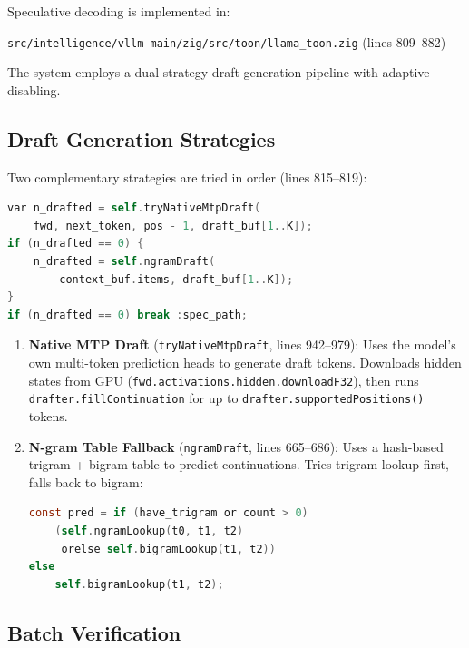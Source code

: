 \documentclass[11pt]{article}
\begin{document}
Speculative decoding is implemented in:
\begin{center}
\texttt{src/intelligence/vllm-main/zig/src/toon/llama\_toon.zig} (lines 809--882)
\end{center}

The system employs a dual-strategy draft generation pipeline with adaptive
disabling.

\subsection{Draft Generation Strategies}

Two complementary strategies are tried in order (lines 815--819):

\begin{lstlisting}[language=C,caption={Dual draft strategy (llama\_toon.zig:815--819)}]
var n_drafted = self.tryNativeMtpDraft(
    fwd, next_token, pos - 1, draft_buf[1..K]);
if (n_drafted == 0) {
    n_drafted = self.ngramDraft(
        context_buf.items, draft_buf[1..K]);
}
if (n_drafted == 0) break :spec_path;
\end{lstlisting}

\begin{enumerate}
  \item \textbf{Native MTP Draft} (\texttt{tryNativeMtpDraft}, lines 942--979):
        Uses the model's own multi-token prediction heads to generate draft tokens.
        Downloads hidden states from GPU (\texttt{fwd.activations.hidden.downloadF32}),
        then runs \texttt{drafter.fillContinuation} for up to
        \texttt{drafter.supportedPositions()} tokens.

  \item \textbf{N-gram Table Fallback} (\texttt{ngramDraft}, lines 665--686):
        Uses a hash-based trigram + bigram table to predict continuations.
        Tries trigram lookup first, falls back to bigram:
\begin{lstlisting}[language=C,caption={N-gram draft logic (llama\_toon.zig:674--678)}]
const pred = if (have_trigram or count > 0)
    (self.ngramLookup(t0, t1, t2)
     orelse self.bigramLookup(t1, t2))
else
    self.bigramLookup(t1, t2);
\end{lstlisting}
\end{enumerate}

\subsection{Batch Verification}
\end{document}
